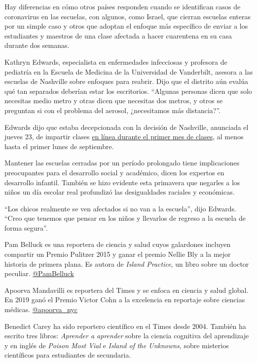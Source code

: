 Hay diferencias en cómo otros países responden cuando se identifican
casos de coronavirus en las escuelas, con algunos, como Israel, que
cierran escuelas enteras por un simple caso y otros que adoptan el
enfoque más específico de enviar a los estudiantes y maestros de una
clase afectada a hacer cuarentena en su casa durante dos semanas.

Kathryn Edwards, especialista en enfermedades infecciosas y profesora de
pediatría en la Escuela de Medicina de la Universidad de Vanderbilt,
asesora a las escuelas de Nashville sobre enfoques para reabrir. Dijo
que el distrito aún evalúa qué tan separados deberían estar los
escritorios. ``Algunas personas dicen que solo necesitas medio metro y
otras dicen que necesitas dos metros, y otros se preguntan si con el
problema del aerosol, ¿necesitamos más distancia?''.

Edwards dijo que estaba decepcionada con la decisión de Nashville,
anunciada el jueves 23, de impartir clases
\href{https://www.tennessean.com/story/news/education/2020/07/09/metro-schools-academic-year-start-online-nashville-students/5383315002/}{en
línea durante el primer mes de clases}, al menos hasta el primer lunes
de septiembre.

Mantener las escuelas cerradas por un período prolongado tiene
implicaciones preocupantes para el desarrollo social y académico, dicen
los expertos en desarrollo infantil. También se hizo evidente esta
primavera que negarles a los niños un día escolar real profundizó las
desigualdades raciales y económicas.

``Los chicos realmente se ven afectados si no van a la escuela'', dijo
Edwards. ``Creo que tenemos que pensar en los niños y llevarlos de
regreso a la escuela de forma segura''.

Pam Belluck es una reportera de ciencia y salud cuyos galardones
incluyen compartir un Premio Pulitzer 2015 y ganar el premio Nellie Bly
a la mejor historia de primera plana. Es autora de \emph{Island
Practice}, un libro sobre un doctor peculiar.
\href{https://twitter.com/PamBelluck}{@PamBelluck}

Apoorva Mandavilli es reportera del Times y se enfoca en ciencia y salud
global. En 2019 ganó el Premio Victor Cohn a la excelencia en reportaje
sobre ciencias médicas.
\href{https://twitter.com/apoorva_nyc}{@apoorva\_nyc}

Benedict Carey ha sido reportero científico en el Times desde 2004.
También ha escrito tres libros: \emph{Aprender a aprender} sobre la
ciencia cognitiva del aprendizaje y en inglés de \emph{Poison Most Vial}
e \emph{Island of the Unknowns}, sobre misterios científicos para
estudiantes de secundaria.


